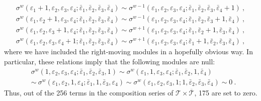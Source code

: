 \documentclass[12pt,a4paper]{article}
\begin{document}
\begin{subequations}
\begin{align}
\sigma^w(\varepsilon_1+1,\varepsilon_2,\varepsilon_3,\varepsilon_4;\bar{\varepsilon}_1,\bar{\varepsilon}_2,\bar{\varepsilon}_3,\bar{\varepsilon}_4) \sim \sigma^{w-1}(\varepsilon_1,\varepsilon_2,\varepsilon_3,\varepsilon_4;\bar{\varepsilon}_1,\bar{\varepsilon}_2,\bar{\varepsilon}_3,\bar{\varepsilon}_4+1)\ , \label{eq:T equivalence relation a}\\
\sigma^w(\varepsilon_1,\varepsilon_2+1,\varepsilon_3,\varepsilon_4;\bar{\varepsilon}_1,\bar{\varepsilon}_2,\bar{\varepsilon}_3,\bar{\varepsilon}_4) \sim \sigma^{w-1}(\varepsilon_1,\varepsilon_2,\varepsilon_3,\varepsilon_4;\bar{\varepsilon}_1,\bar{\varepsilon}_2,\bar{\varepsilon}_3+1,\bar{\varepsilon}_4)\ , \label{eq:T equivalence relation b}\\
\sigma^w(\varepsilon_1,\varepsilon_2,\varepsilon_3+1,\varepsilon_4;\bar{\varepsilon}_1,\bar{\varepsilon}_2,\bar{\varepsilon}_3,\bar{\varepsilon}_4) \sim \sigma^{w+1}(\varepsilon_1,\varepsilon_2,\varepsilon_3,\varepsilon_4;\bar{\varepsilon}_1,\bar{\varepsilon}_2+1,\bar{\varepsilon}_3,\bar{\varepsilon}_4)\ , \label{eq:T equivalence relation c}\\
\sigma^w(\varepsilon_1,\varepsilon_2,\varepsilon_3,\varepsilon_4+1;\bar{\varepsilon}_1,\bar{\varepsilon}_2,\bar{\varepsilon}_3,\bar{\varepsilon}_4) \sim \sigma^{w+1}(\varepsilon_1,\varepsilon_2,\varepsilon_3,\varepsilon_4;\bar{\varepsilon}_1+1,\bar{\varepsilon}_2,\bar{\varepsilon}_3,\bar{\varepsilon}_4)\ , \label{eq:T equivalence relation d}
\end{align}
\end{subequations}
where we have included the right-moving modules in a hopefully obvious way.
In particular, these relations imply that the following modules are null:
\begin{align}
&\sigma^w(1,\varepsilon_2,\varepsilon_3,\varepsilon_4;\bar{\varepsilon}_1,\bar{\varepsilon}_2,\bar{\varepsilon}_3,1)\sim \sigma^w(\varepsilon_1,1,\varepsilon_3,\varepsilon_4;\bar{\varepsilon}_1,\bar{\varepsilon}_2,1,\bar{\varepsilon}_4)\\
 & \sim \ \sigma^w(\varepsilon_1,\varepsilon_2,1,\varepsilon_4;\bar{\varepsilon}_1,1,\bar{\varepsilon}_3,\varepsilon_4)\sim \sigma^w(\varepsilon_1,\varepsilon_2,\varepsilon_3,1;1,\bar{\varepsilon}_2,\bar{\varepsilon}_3,\bar{\varepsilon}_4)\sim 0\ .
\end{align}
Thus, out of the 256 terms in the composition series of $\mathscr{T} \times \overline{\mathscr{T}}$, 175 are set to zero. 
\end{document}
